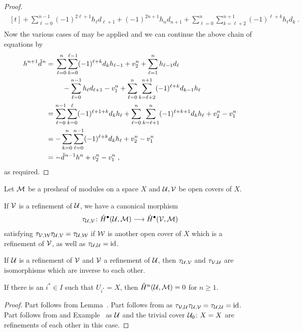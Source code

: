 \documentclass[a4paper,parskip=half,numbers=enddot, DIV=12]{scrreprt}
\renewcommand{\geq}{\geqslant}
\begin{document}
\begin{proof}
\begin{align*}
\begin{multlined}[t]
			+\sum_{\ell=0}^{n-1}(-1)^{2\ell+1}h_\ell d_{\ell+1}+(-1)^{2n+1}h_nd_{n+1}+\sum_{\ell=0}^{n}\sum_{k=\ell+2}^{n+1}(-1)^{\ell+k}h_\ell d_k\;.
		\end{multlined}
	\end{align*}
	Now the various cases of  may be applied and we can continue the above chain of equations by
	\begin{align*}
		h^{n+1}\hacek{d}^n&=\begin{multlined}[t]
			\sum_{\ell=0}^{n}\sum_{k=0}^{\ell-1}(-1)^{\ell+k}d_k h_{\ell-1}+v_2^n+\sum_{\ell=1}^{n}h_{\ell-1} d_\ell\\
			-\sum_{\ell=0}^{n-1}h_\ell d_{\ell+1}-v_1^n+\sum_{\ell=0}^{n}\sum_{k=\ell+2}^{n+1}(-1)^{\ell+k}d_{k-1} h_{\ell}
		\end{multlined}\\
		&=\sum_{\ell=0}^{n-1}\sum_{k=0}^{\ell}(-1)^{\ell+1+k}d_k h_{\ell}+\sum_{\ell=0}^{n}\sum_{k=\ell+1}^{n}(-1)^{\ell+k+1}d_{k} h_{\ell}+v_2^n-v_1^n\\
		&=-\sum_{k=0}^{n}\sum_{\ell=0}^{n-1}(-1)^{\ell+k}d_kh_\ell +v_2^n-v_1^n\\
		&=-\hacek{d}^{n-1}h^n+v_2^n-v_1^n\;,
	\end{align*}
	as required.
\end{proof}
\begin{cor}
	Let $\mathcal{M}$ be a presheaf of modules on a space $X$ and $\mathcal{U},\mathcal{V}$ be open covers of $X$.
	\begin{alphanumerate} 
		\item If $\mathcal{V}$ is a refinement of $\mathcal{U}$, we have a canonical morphism 
		\begin{align*}
			\tau_{\Uu,\Vv}\colon \check{H}^\bullet (\Uu,\Mm)\morphism\check{H}^\bullet (\Vv,\Mm)
		\end{align*}
		satisfying $\tau_{\mathcal{V},\mathcal{W}}\tau_{\mathcal{U},\mathcal{V}}=\tau_{\mathcal{U},\mathcal{W}}$ if $\mathcal{W}$ is another open cover of $X$ which is a refinement of $\mathcal{V}$, as well as $\tau_{\mathcal{U},\mathcal{U}}=\operatorname{id}$.
		\item If $\mathcal{U}$ is a refinement of $\mathcal{V}$ and $\mathcal{V}$ a refinement of $\mathcal{U}$, then $\tau_{\mathcal{U},\mathcal{V}}$ and $\tau_{\mathcal{V},\mathcal{U}}$ are isomorphisms which are inverse to each other.
		\item If there is an $i^*\in I$ such that $U_{i^*}=X$, then $\check{H}^n(\mathcal{U},\mathcal{M})=0$ for $n\geq 1$.
	\end{alphanumerate}
\end{cor}
\begin{proof}
	Part  follows from Lemma~. Part  follows from  as $\tau_{\mathcal{V},\mathcal{U}}\tau_{\mathcal{U},\mathcal{V}}=\tau_{\mathcal{U},\mathcal{U}}=\operatorname{id}$. Part  follows from  and Example~ as $\mathcal{U}$ and the trivial cover $\mathcal{U}_0\colon X=X$ are refinements of each other in this case.
\end{proof}
\end{document}
